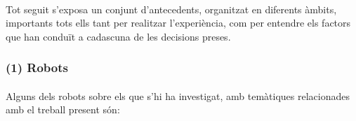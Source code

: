 \documentclass[12pt,a4paper,final,twoside]{article}
\begin{document}
\paragraph{}Tot seguit s'exposa un conjunt d'antecedents, organitzat en diferents àmbits, importants tots ells tant per realitzar l'experiència, com per entendre els factors que han conduït a cadascuna de les decisions preses.

\label{Robots}
\subsubsection*{(1) Robots}

\paragraph{}Alguns dels robots sobre els que s'hi ha investigat, amb temàtiques relacionades amb el treball present són:
\end{document}
